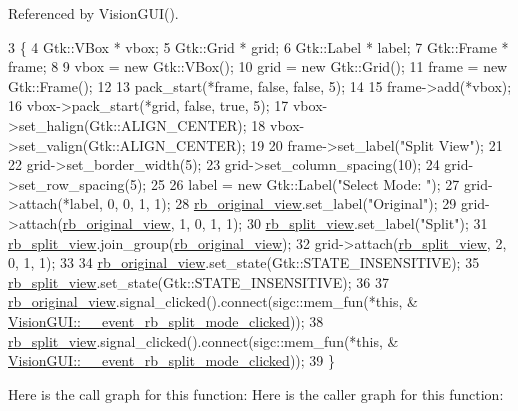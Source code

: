 Referenced by Vision\+G\+U\+I().


\begin{DoxyCode}
3                                         \{
4     Gtk::VBox * vbox;
5     Gtk::Grid * grid;
6     Gtk::Label * label;
7     Gtk::Frame * frame;
8 
9     vbox = \textcolor{keyword}{new} Gtk::VBox();
10     grid = \textcolor{keyword}{new} Gtk::Grid();
11     frame = \textcolor{keyword}{new} Gtk::Frame();
12 
13     pack\_start(*frame, \textcolor{keyword}{false}, \textcolor{keyword}{false}, 5);
14 
15     frame->add(*vbox);
16     vbox->pack\_start(*grid, \textcolor{keyword}{false}, \textcolor{keyword}{true}, 5);
17     vbox->set\_halign(Gtk::ALIGN\_CENTER);
18     vbox->set\_valign(Gtk::ALIGN\_CENTER);
19 
20     frame->set\_label(\textcolor{stringliteral}{"Split View"});
21 
22     grid->set\_border\_width(5);
23     grid->set\_column\_spacing(10);
24     grid->set\_row\_spacing(5);
25 
26     label = \textcolor{keyword}{new} Gtk::Label(\textcolor{stringliteral}{"Select Mode: "});
27     grid->attach(*label, 0, 0, 1, 1);
28     \hyperlink{class_vision_g_u_i_abb4ca4d613412da2ce06c55a8a37a7f2}{rb\_original\_view}.set\_label(\textcolor{stringliteral}{"Original"});
29     grid->attach(\hyperlink{class_vision_g_u_i_abb4ca4d613412da2ce06c55a8a37a7f2}{rb\_original\_view}, 1, 0, 1, 1);
30     \hyperlink{class_vision_g_u_i_a7fec73756125a9e179f91cde80658897}{rb\_split\_view}.set\_label(\textcolor{stringliteral}{"Split"});
31     \hyperlink{class_vision_g_u_i_a7fec73756125a9e179f91cde80658897}{rb\_split\_view}.join\_group(\hyperlink{class_vision_g_u_i_abb4ca4d613412da2ce06c55a8a37a7f2}{rb\_original\_view});
32     grid->attach(\hyperlink{class_vision_g_u_i_a7fec73756125a9e179f91cde80658897}{rb\_split\_view}, 2, 0, 1, 1);
33 
34     \hyperlink{class_vision_g_u_i_abb4ca4d613412da2ce06c55a8a37a7f2}{rb\_original\_view}.set\_state(Gtk::STATE\_INSENSITIVE);
35     \hyperlink{class_vision_g_u_i_a7fec73756125a9e179f91cde80658897}{rb\_split\_view}.set\_state(Gtk::STATE\_INSENSITIVE);
36 
37     \hyperlink{class_vision_g_u_i_abb4ca4d613412da2ce06c55a8a37a7f2}{rb\_original\_view}.signal\_clicked().connect(sigc::mem\_fun(*\textcolor{keyword}{this}, &
      \hyperlink{class_vision_g_u_i_a51c0888c14eb2b773e18d739df076e03}{VisionGUI::\_\_event\_rb\_split\_mode\_clicked}));
38     \hyperlink{class_vision_g_u_i_a7fec73756125a9e179f91cde80658897}{rb\_split\_view}.signal\_clicked().connect(sigc::mem\_fun(*\textcolor{keyword}{this}, &
      \hyperlink{class_vision_g_u_i_a51c0888c14eb2b773e18d739df076e03}{VisionGUI::\_\_event\_rb\_split\_mode\_clicked}));
39 \}
\end{DoxyCode}
Here is the call graph for this function\+:
Here is the caller graph for this function\+:
\mbox{\label{class_vision_g_u_i_ad476738b0d45d8decb5d5789c7cbc611}} 
